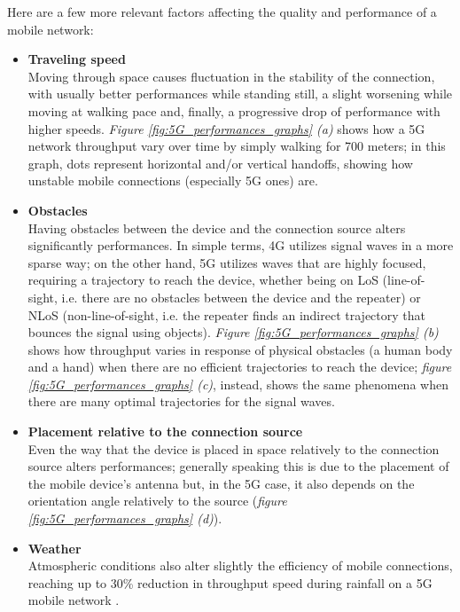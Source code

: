 Here are a few more relevant factors affecting the quality and performance of a mobile network:
\begin{itemize}
    \item \textbf{Traveling speed}\\
    Moving through space causes fluctuation in the stability of the connection, with usually better performances while standing still, a slight worsening while moving at walking pace and, finally, a progressive drop of performance with higher speeds. \textit{Figure \ref{fig:5G_performances_graphs} (a)} shows how a 5G network throughput vary over time by simply walking for 700 meters; in this graph, dots represent horizontal and/or vertical handoffs, showing how unstable mobile connections (especially 5G ones) are.
    \item \textbf{Obstacles}\\
    Having obstacles between the device and the connection source alters significantly performances. In simple terms, 4G utilizes signal waves in a more sparse way; on the other hand, 5G utilizes waves that are highly focused, requiring a trajectory to reach the device, whether being on LoS (line-of-sight, i.e. there are no obstacles between the device and the repeater) or NLoS (non-line-of-sight, i.e. the repeater finds an indirect trajectory that bounces the signal using objects). \textit{Figure \ref{fig:5G_performances_graphs} (b)} shows how throughput varies in response of physical obstacles (a human body and a hand) when there are no efficient trajectories to reach the device; \textit{figure \ref{fig:5G_performances_graphs} (c)}, instead, shows the same phenomena when there are many optimal trajectories for the signal waves.
    \item \textbf{Placement relative to the connection source}\\
    Even the way that the device is placed in space relatively to the connection source alters performances; generally speaking this is due to the placement of the mobile device's antenna but, in the 5G case, it also depends on the orientation angle relatively to the source (\textit{figure \ref{fig:5G_performances_graphs} (d)}).
    \item \textbf{Weather}\\
    Atmospheric conditions also alter slightly the efficiency of mobile connections, reaching up to 30\% reduction in throughput speed during rainfall on a 5G mobile network \cite{5g_performances}.
\end{itemize}

